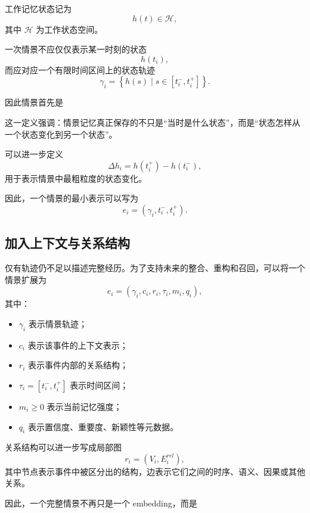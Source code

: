 工作记忆状态记为
\[
h(t)\in\mathcal{H},
\]
其中 $\mathcal{H}$ 为工作状态空间。

一次情景不应仅仅表示某一时刻的状态
\[
h(t_i),
\]
而应对应一个有限时间区间上的状态轨迹
\[
\gamma_i
=
\left\{
h(s)
\mid
s\in[t_i^{-},t_i^{+}]
\right\}.
\]

因此情景首先是
\begin{statementbox}
\centering
{}
\end{statementbox}

这一定义强调：情景记忆真正保存的不只是“当时是什么状态”，而是“状态怎样从一个状态变化到另一个状态”。

可以进一步定义
\[
\Delta h_i
=
h(t_i^{+})
-
h(t_i^{-}),
\]
用于表示情景中最粗粒度的状态变化。

因此，一个情景的最小表示可以写为
\[
e_i
=
\left(
\gamma_i,
t_i^{-},
t_i^{+}
\right).
\]

\subsection{加入上下文与关系结构}

仅有轨迹仍不足以描述完整经历。为了支持未来的整合、重构和召回，可以将一个情景扩展为
\[
\boxed{
e_i
=
\left(
\gamma_i,
c_i,
r_i,
\tau_i,
m_i,
q_i
\right),
}
\]
其中：

\begin{itemize}
    \item $\gamma_i$ 表示情景轨迹；
    \item $c_i$ 表示该事件的上下文表示；
    \item $r_i$ 表示事件内部的关系结构；
    \item $\tau_i=[t_i^{-},t_i^{+}]$ 表示时间区间；
    \item $m_i\geq0$ 表示当前记忆强度；
    \item $q_i$ 表示置信度、重要度、新颖性等元数据。
\end{itemize}

关系结构可以进一步写成局部图
\[
r_i
=
(V_i,E_i^{rel}),
\]
其中节点表示事件中被区分出的结构，边表示它们之间的时序、语义、因果或其他关系。

因此，一个完整情景不再只是一个 embedding，而是
\begin{statementbox}
\centering
{}
\end{statementbox}

